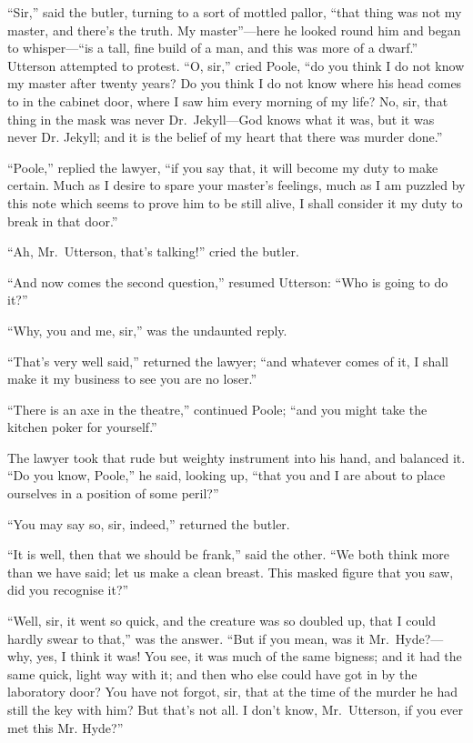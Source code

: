 \documentclass[12pt,openright]{book}
\begin{document}
“Sir,” said the butler, turning to a sort of mottled pallor, “that thing was not my master, and there’s the truth. My master”—here he looked round him and began to whisper—“is a tall, fine build of a man, and this was more of a dwarf.” Utterson attempted to protest. “O, sir,” cried Poole, “do you think I do not know my master after twenty years? Do you think I do not know where his head comes to in the cabinet door, where I saw him every morning of my life? No, sir, that thing in the mask was never Dr. Jekyll—God knows what it was, but it was never Dr. Jekyll; and it is the belief of my heart that there was murder done.”

“Poole,” replied the lawyer, “if you say that, it will become my duty to make certain. Much as I desire to spare your master’s feelings, much as I am puzzled by this note which seems to prove him to be still alive, I shall consider it my duty to break in that door.”

“Ah, Mr. Utterson, that’s talking!” cried the butler.

“And now comes the second question,” resumed Utterson: “Who is going to do it?”

“Why, you and me, sir,” was the undaunted reply.

“That’s very well said,” returned the lawyer; “and whatever comes of it, I shall make it my business to see you are no loser.”

“There is an axe in the theatre,” continued Poole; “and you might take the kitchen poker for yourself.”

The lawyer took that rude but weighty instrument into his hand, and balanced it. “Do you know, Poole,” he said, looking up, “that you and I are about to place ourselves in a position of some peril?”

“You may say so, sir, indeed,” returned the butler.

“It is well, then that we should be frank,” said the other. “We both think more than we have said; let us make a clean breast. This masked figure that you saw, did you recognise it?”

“Well, sir, it went so quick, and the creature was so doubled up, that I could hardly swear to that,” was the answer. “But if you mean, was it Mr. Hyde?—why, yes, I think it was! You see, it was much of the same bigness; and it had the same quick, light way with it; and then who else could have got in by the laboratory door? You have not forgot, sir, that at the time of the murder he had still the key with him? But that’s not all. I don’t know, Mr. Utterson, if you ever met this Mr. Hyde?”
\end{document}
